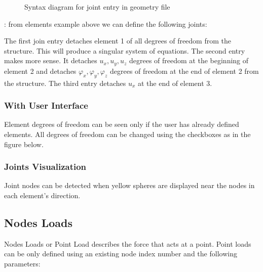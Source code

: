 \documentclass[letterpaper,10pt,english]{sphinxmanual}
\begin{document}
\begin{figure}[htbp]
\centering
\capstart

\noindent{}
\caption{Syntax diagram for joint entry in geometry file}\label{\detokenize{making_a_model:id24}}\end{figure}

:
from elements example above we can define the following joints:

\begin{sphinxVerbatim}[commandchars=\\\{\}]
\end{sphinxVerbatim}

The first join entry detaches element 1 of all degrees of freedom from the structure.
This will produce a singular system of equations.
The second entry makes more sense. It detaches \(u_x, u_y, u_z\) degrees of freedom
at the beginning of element 2 and detaches \(\varphi_x, \varphi_y, \varphi_z\) degrees of freedom at the end of
element 2 from the structure. The third entry detaches \(u_x\) at the end of element 3.


\subsubsection{With User Interface}
\label{\detokenize{making_a_model:id10}}
Element degrees of freedom can be seen only if the user has already defined elements.
All degrees of freedom can be changed using the checkboxes as in the figure below.

\noindent{}


\subsubsection{Joints Visualization}
\label{\detokenize{making_a_model:joints-visualization}}
Joint nodes can be detected when yellow spheres are displayed near the nodes in each element’s direction.

\noindent{}


\subsection{Nodes Loads}
\label{\detokenize{making_a_model:nodes-loads}}
Nodes Loads or Point Load describes the force that acts at a point.
Point loads can be only defined using an existing node index number and the following parameters:
\end{document}
